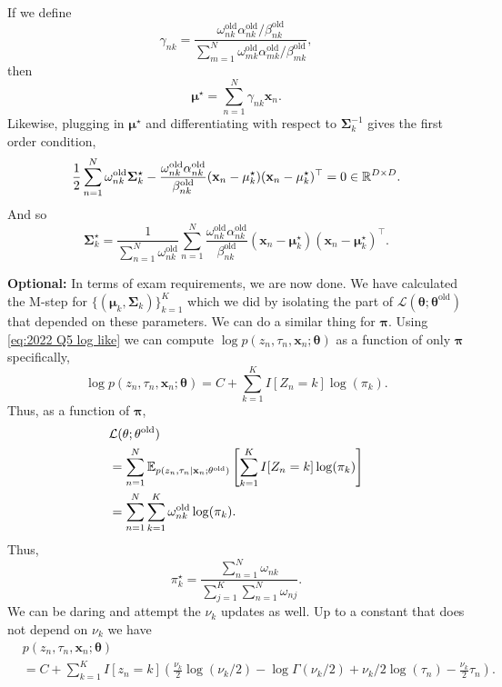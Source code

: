 \begin{enumerate}[label = (\alph*)]
\begin{align*}
    \end{align*}
    If we define 
    \[\gamma_{nk} = \frac{\omega_{nk}^{\mathrm{old}}\alpha_{nk}^{\mathrm{old}}/\beta_{nk}^{\mathrm{old}}}{\sum_{m=1}^N \omega_{mk}^{\mathrm{old}}\alpha_{mk}^{\mathrm{old}}/\beta_{mk}^{\mathrm{old}}}, \]
    then 
    \[ \mathbf{\mu}^\star = \sum_{n=1}^N \gamma_{nk} \mathbf{x}_n.\]
    Likewise, plugging in $\mathbf{\mu}^\star$ and differentiating with respect to $\mathbf{\Sigma}_k^{-1}$ gives the first order condition,
    \[\frac{1}{2}\sum_{n=1}^N \omega_{nk}^{\text{old}}\mathbf{\Sigma}_k^\star - \frac{\omega_{nk}^{\mathrm{old}}\alpha_{nk}^{\mathrm{old}}}{\beta_{nk}^{\mathrm{old}}}(\mathbf{x}_n-\mathbf{\mu}_k^\star)(\mathbf{x}_n - \mathbf{\mu}_k^\star)^\top = 0 \in \mathbb{R}^{D \times D}. \]
    And so
    \[\mathbf{\Sigma}_k^\star = \frac{1}{\sum_{n=1}^N \omega_{nk}^\text{old}} \sum_{n=1}^N \frac{\omega_{nk}^{\mathrm{old}}\alpha_{nk}^{\mathrm{old}}}{\beta_{nk}^{\mathrm{old}}}(\mathbf{x}_n-\mathbf{\mu}_k^\star)(\mathbf{x}_n - \mathbf{\mu}_k^\star)^\top.  \]
\end{enumerate}
\textbf{Optional:}  In terms of exam requirements, we are now done. We have calculated the M-step for $\{(\mathbf{\mu}_k,\mathbf{\Sigma}_k)\}_{k=1}^K$ which we did by isolating the part of $\mathcal{L}(\mathbf{\theta};\mathbf{\theta}^{\text{old}})$ that depended on these parameters. We can do a similar thing for $\mathbf{\pi}$. Using \eqref{eq:2022 Q5 log like} we can compute $\log p(z_n,\tau_n,\mathbf{x}_n;\mathbf{\theta})$ as a function of only $\mathbf{\pi}$ specifically,
\[\log p(z_n,\tau_n,\mathbf{x}_n;\mathbf{\theta}) = C +\sum_{k=1}^K I[Z_n = k]\log(\pi_k). \]
Thus, as a function of $\mathbf{\pi}$,
\begin{align*}
    &\mathcal{L}(\mathbf{\theta};\mathbf{\theta}^{\text{old}})\\
    &=\sum_{n=1}^N{\mathbb E}_{p(z_n,\tau_n\mid \mathbf{x}_n;\mathbf{\theta}^{\text{old}})}\left[\sum_{k=1}^KI[Z_n=k]\log(\pi_k)\right]\\
    &=\sum_{n=1}^N \sum_{k=1}^K\omega_{nk}^{\text{old}}\log(\pi_k).
\end{align*}
Thus,
\[\pi_k^\star = \frac{\sum_{n=1}^N \omega_{nk}}{\sum_{j=1}^K\sum_{n=1}^N \omega_{nj}}. \]
We can be daring and attempt the $\nu_k$ updates as well. Up to a constant that does not depend on $\nu_k$ we have
\begin{align*}
   & p(z_n,\tau_n,\mathbf{x}_n;\mathbf{\theta})\\
   &=C+\sum_{k=1}^KI[z_n = k]\left(\frac{\nu_k}{2}\log(\nu_k/2)-\log \Gamma(\nu_k/2) + \nu_k/2\log(\tau_n) -\frac{\nu_k}{2}\tau_n\right).
\end{align*}
